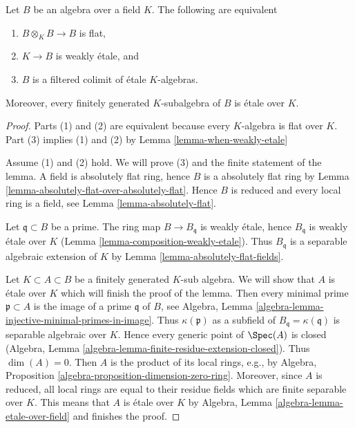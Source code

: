 \begin{lemma}
\label{lemma-absolutely-flat-over-field}
Let $B$ be an algebra over a field $K$. The following are
equivalent
\begin{enumerate}
\item $B \otimes_K B \to B$ is flat,
\item $K \to B$ is weakly \'etale, and
\item $B$ is a filtered colimit of \'etale $K$-algebras.
\end{enumerate}
Moreover, every finitely generated $K$-subalgebra of $B$
is \'etale over $K$.
\end{lemma}

\begin{proof}
Parts (1) and (2) are equivalent because every $K$-algebra is flat over $K$.
Part (3) implies (1) and (2) by Lemma \ref{lemma-when-weakly-etale}

\medskip\noindent
Assume (1) and (2) hold. We will prove (3) and the finite statement of
the lemma. A field is absolutely flat ring, hence $B$ is a absolutely
flat ring by Lemma \ref{lemma-absolutely-flat-over-absolutely-flat}.
Hence $B$ is reduced and every local
ring is a field, see Lemma \ref{lemma-absolutely-flat}.

\medskip\noindent
Let $\mathfrak q \subset B$ be a prime. The ring map
$B \to B_\mathfrak q$ is weakly \'etale, hence $B_\mathfrak q$
is weakly \'etale over $K$ (Lemma \ref{lemma-composition-weakly-etale}).
Thus $B_\mathfrak q$ is a separable algebraic extension of $K$ by
Lemma \ref{lemma-absolutely-flat-fields}.

\medskip\noindent
Let $K \subset A \subset B$ be a finitely generated $K$-sub algebra.
We will show that $A$ is \'etale over $K$ which will finish the proof
of the lemma.
Then every minimal prime $\mathfrak p \subset A$ is the image of a prime
$\mathfrak q$ of $B$, see
Algebra, Lemma \ref{algebra-lemma-injective-minimal-primes-in-image}.
Thus $\kappa(\mathfrak p)$ as a subfield of
$B_\mathfrak q = \kappa(\mathfrak q)$ is separable algebraic over $K$.
Hence every generic point of $\Spec(A)$
is closed (Algebra, Lemma \ref{algebra-lemma-finite-residue-extension-closed}).
Thus $\dim(A) = 0$.
Then $A$ is the product of its local rings, e.g., by
Algebra, Proposition \ref{algebra-proposition-dimension-zero-ring}.
Moreover, since $A$ is reduced, all local rings are equal
to their residue fields which are finite separable over $K$.
This means that $A$ is \'etale over $K$ by
Algebra, Lemma \ref{algebra-lemma-etale-over-field}
and finishes the proof.
\end{proof}
